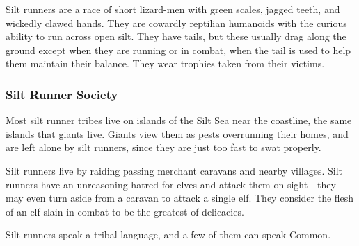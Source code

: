 Silt runners are a race of short lizard-men with green scales, jagged teeth, and wickedly clawed hands. They are cowardly reptilian humanoids with the curious ability to run across open silt. They have tails, but these usually drag along the ground except when they are running or in combat, when the tail is used to help them maintain their balance. They wear trophies taken from their victims.

\subsubsection{Silt Runner Society}
Most silt runner tribes live on islands of the Silt Sea near the coastline, the same islands that giants live. Giants view them as pests overrunning their homes, and are left alone by silt runners, since they are just too fast to swat properly.

Silt runners live by raiding passing merchant caravans and nearby villages. Silt runners have an unreasoning hatred for elves and attack them on sight---they may even turn aside from a caravan to attack a single elf. They consider the flesh of an elf slain in combat to be the greatest of delicacies.

Silt runners speak a tribal language, and a few of them can speak Common.


